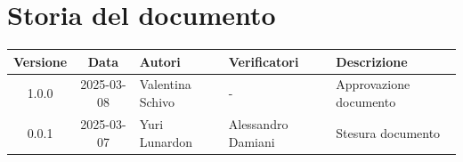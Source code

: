 \section*{Storia del documento}
\begin{tabularx}{\textwidth}{ c c p{3cm} p{3.17cm} X }
    \rowcolor{gray!20}\rule{0pt}{0.5cm}\textbf{Versione} & \textbf{Data} & \textbf{Autori} & \textbf{Verificatori} & \textbf{Descrizione} \\[0.7ex]
    
    \hline
    \rule{0pt}{0.5cm}1.0.0 & 2025-03-08 & Valentina Schivo & - & Approvazione documento\\[0.7ex]
    \hline
    \rule{0pt}{0.5cm}0.0.1 & 2025-03-07 & Yuri Lunardon & Alessandro Damiani & Stesura documento\\[0.7ex] 
\end{tabularx}
